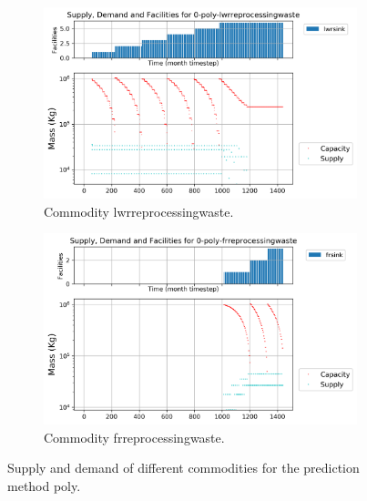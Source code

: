\documentclass[11pt]{article}
\begin{document}
\begin{figure}[H]
	\centering
	\begin{subfigure}[t]{0.45\textwidth}
		\centering
		\includegraphics[width=\linewidth]{23-figures/0-poly-lwrreprocessingwaste.png} 
		\caption{Commodity lwrreprocessingwaste.}
		\label{fig:23-lwrreprocessingwaste}
	\end{subfigure}
	\vspace{1cm}
	\begin{subfigure}[t]{0.45\textwidth}
		\centering
		\includegraphics[width=\linewidth]{23-figures/0-poly-frreprocessingwaste.png} 
		\caption{Commodity frreprocessingwaste.}
		\label{fig:23-frreprocessingwaste}
	\end{subfigure}
	\hfill
	\caption{Supply and demand of different commodities for the prediction method poly.}
	\label{fig:23-waste}
\end{figure}
\end{document}
